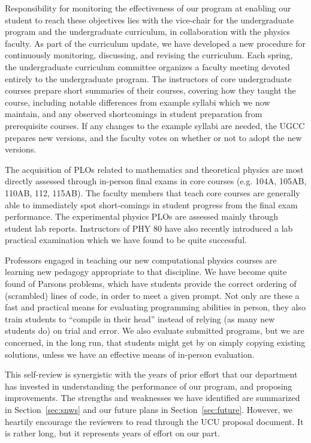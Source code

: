 \documentclass[12pt]{article}
\begin{document}
Responsibility for monitoring the effectiveness of our program at
enabling our student to reach these objectives lies with the
vice-chair for the undergraduate program and the undergraduate
curriculum, in collaboration with the physics faculty.  As part of the
curriculum update, we have developed a new procedure for continuously
monitoring, discussing, and revising the curriculum.  Each spring, the
undergraduate curriculum committee organizes a faculty meeting devoted
entirely to the undergraduate program.  The instructors of core
undergraduate courses prepare short summaries of their courses,
covering how they taught the course, including notable differences
from example syllabi which we now maintain, and any observed
shortcomings in student preparation from prerequisite courses.  If any
changes to the example syllabi are needed, the UGCC prepares new
versions, and the faculty votes on whether or not to adopt the new
versions.

The acquisition of PLOs related to mathematics and theoretical physics
are most directly assessed through in-person final exams in core
courses (e.g. 104A, 105AB, 110AB, 112, 115AB).  The faculty members
that teach core courses are generally able to immediately spot
short-comings in student progress from the final exam performance.
The experimental physics PLOs are assessed mainly through student lab
reports.  Instructors of PHY 80 have also recently introduced a lab
practical examination which we have found to be quite successful.

Professors engaged in teaching our new computational physics courses
are learning new pedagogy appropriate to that discipline.  We have
become quite found of Parsons problems, which have students provide
the correct ordering of (scrambled) lines of code, in order to meet a
given prompt.  Not only are these a fast and practical means for
evaluating programming abilities in person, they also train students
to ``compile in their head'' instead of relying (as many new students
do) on trial and error.  We also evaluate submitted programs, but we
are concerned, in the long run, that students might get by on simply
copying existing solutions, unless we have an effective means of
in-person evaluation.

This self-review is synergistic with the years of prior effort that
our department has invested in understanding the performance of our
program, and proposing improvements.  The strengths and weaknesses we
have identified are summarized in Section~\ref{sec:snws} and our
future plans in Section~\ref{sec:future}.  However, we heartily
encourage the reviewers to read through the UCU proposal document.  It
is rather long, but it represents years of effort on our part.\\[3pt]
\end{document}
